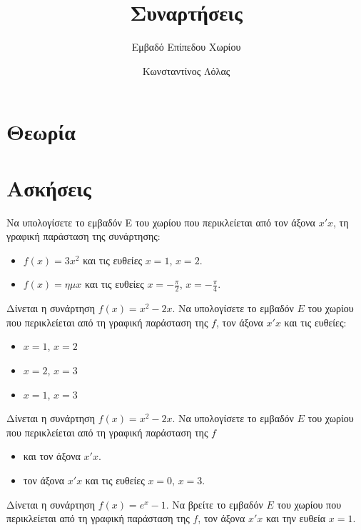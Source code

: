 \documentclass{presentation}
\title{Συναρτήσεις}
\subtitle{Εμβαδό Επίπεδου Χωρίου}
\author[Λόλας]{Κωνσταντίνος Λόλας}
\begin{document}
\begin{frame}
  \titlepage
\end{frame}

\section{Θεωρία}


\section{Ασκήσεις}

\exercises

\begin{askisi}
  Να υπολογίσετε το εμβαδόν E του χωρίου που περικλείεται από τον άξονα $x'x$, τη γραφική παράσταση της συνάρτησης:
  \begin{itemize}[<+->]
    \item $f(x)=3x^2$ και τις ευθείες $x=1$, $x=2$.
    \item $f(x)=ημx$ και τις ευθείες $x=-\frac{π}{2}$, $x=-\frac{π}{4}$.
  \end{itemize}
\end{askisi}

\begin{askisi}
  Δίνεται η συνάρτηση $f(x)=x^2-2x$. Να υπολογίσετε το εμβαδόν $E$ του χωρίου που περικλείεται από τη γραφική παράσταση της $f$, τον άξονα $x'x$ και τις ευθείες:
  \begin{itemize}[<+->]
    \item $x=1$, $x=2$
    \item $x=2$, $x=3$
    \item $x=1$, $x=3$
  \end{itemize}
\end{askisi}

\begin{askisi}
  Δίνεται η συνάρτηση $f(x)=x^2-2x$. Να υπολογίσετε το εμβαδόν $E$ του χωρίου που περικλείεται από τη γραφική παράσταση της $f$
  \begin{itemize}[<+->]
    \item και τον άξονα $x'x$.
    \item τον άξονα $x'x$ και τις ευθείες $x=0$, $x=3$.
  \end{itemize}
\end{askisi}

\begin{askisi}
  Δίνεται η συνάρτηση $f(x)=e^x-1$. Να βρείτε το εμβαδόν $E$ του χωρίου που περικλείεται από τη γραφική παράσταση της $f$, τον άξονα $x'x$ και την ευθεία $x=1$.
\end{askisi}
\end{document}
